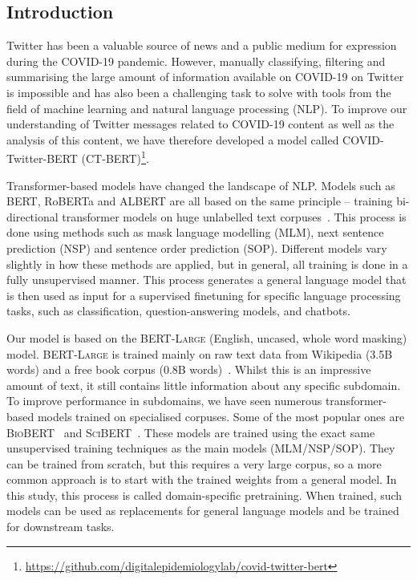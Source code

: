 \documentclass{article}
\begin{document}
\begin{multicols}{2}
\section{Introduction}
\label{sec:introduction}
Twitter has been a valuable source of news and a public medium for expression during the COVID-19 pandemic.
However, manually classifying, filtering and summarising the large amount of information available on COVID-19 on Twitter is impossible and has also been a challenging task to solve with tools from the field of machine learning and natural language processing (NLP).
To improve our understanding of Twitter messages related to COVID-19 content as well as the analysis of this content, we have therefore developed a model called COVID-Twitter-BERT (\textsc{CT-BERT})\footnote{\url{https://github.com/digitalepidemiologylab/covid-twitter-bert}}.

Transformer-based models have changed the landscape of NLP.
Models such as BERT, RoBERTa and ALBERT are all based on the same principle -- training bi-directional transformer models on huge unlabelled text corpuses~\cite{vaswani2017attention,devlin2018bert,liu2019roberta,lan2019albert}.
This process is done using methods such as mask language modelling (MLM), next sentence prediction (NSP) and sentence order prediction (SOP).
Different models vary slightly in how these methods are applied, but in general, all training is done in a fully unsupervised manner.
This process generates a general language model that is then used as input for a supervised finetuning for specific language processing tasks, such as classification, question-answering models, and chatbots.\par

Our model is based on the \textsc{BERT-Large} (English, uncased, whole word masking) model.
\textsc{BERT-Large} is trained mainly on raw text data from Wikipedia (3.5B words) and a free book corpus (0.8B words)~\cite{devlin2018bert}.
Whilst this is an impressive amount of text, it still contains little information about any specific subdomain.
To improve performance in subdomains, we have seen numerous transformer-based models trained on specialised corpuses.
  Some of the most popular ones are \textsc{BioBERT}~\cite{lee2020biobert} and \textsc{SciBERT}~\cite{beltagy2019scibert}.
These models are trained using the exact same unsupervised training techniques as the main models (MLM/NSP/SOP).
They can be trained from scratch, but this requires a very large corpus, so a more common approach is to start with the trained weights from a general model.
In this study, this process is called domain-specific pretraining.
When trained, such models can be used as replacements for general language models and be trained for downstream tasks.


\end{multicols}
\end{document}
